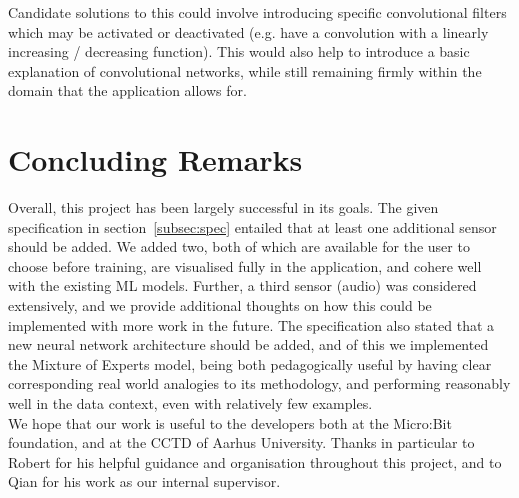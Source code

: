 \documentclass{article}
\begin{document}
Candidate solutions to this could involve introducing specific convolutional filters which may be activated or deactivated (e.g. have a convolution with a linearly increasing / decreasing function). This would also help to introduce a basic explanation of convolutional networks, while still remaining firmly within the domain that the application allows for.

\section{Concluding Remarks}%
\label{sec:conclusion}

Overall, this project has been largely successful in its goals. The given specification in section~\ref{subsec:spec} entailed that at least one additional sensor should be added. We added two, both of which are available for the user to choose before training, are visualised fully in the application, and cohere well with the existing ML models. Further, a third sensor (audio) was considered extensively, and we provide additional thoughts on how this could be implemented with more work in the future. The specification also stated that a new neural network architecture should be added, and of this we implemented the Mixture of Experts model, being both pedagogically useful by having clear corresponding real world analogies to its methodology, and performing reasonably well in the data context, even with relatively few examples. \\

We hope that our work is useful to the developers both at the Micro:Bit foundation, and at the CCTD of Aarhus University. Thanks in particular to Robert for his helpful guidance and organisation throughout this project, and to Qian for his work as our internal supervisor.


\raggedright
\end{document}
